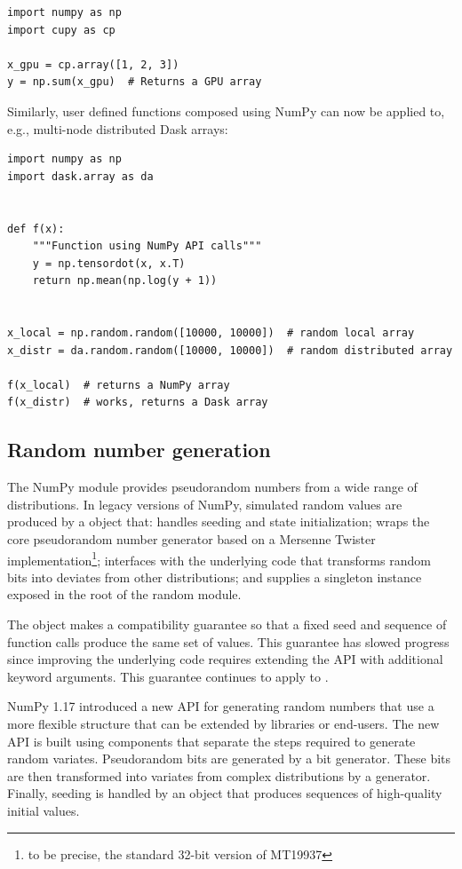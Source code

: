 \begin{lstlisting}
import numpy as np
import cupy as cp

x_gpu = cp.array([1, 2, 3])
y = np.sum(x_gpu)  # Returns a GPU array
\end{lstlisting}

Similarly, user defined functions composed using NumPy can now be
applied to, e.g., multi-node distributed Dask arrays:

\begin{lstlisting}
import numpy as np
import dask.array as da


def f(x):
    """Function using NumPy API calls"""
    y = np.tensordot(x, x.T)
    return np.mean(np.log(y + 1))


x_local = np.random.random([10000, 10000])  # random local array
x_distr = da.random.random([10000, 10000])  # random distributed array

f(x_local)  # returns a NumPy array
f(x_distr)  # works, returns a Dask array
\end{lstlisting}

\subsection*{Random number generation}

The NumPy  module provides pseudorandom numbers from a wide range of
distributions. In legacy versions of NumPy, simulated random values are produced
by a  object that: handles seeding and state initialization;
wraps the core pseudorandom number generator based on a Mersenne Twister
implementation\footnote{to be precise, the standard 32-bit version of MT19937};
interfaces with the underlying code that transforms random bits into
deviates from other distributions; and supplies a singleton instance exposed in
the root of the random module.

The  object makes a compatibility guarantee so that a fixed
seed and sequence of function calls produce the same set of values. This
guarantee has slowed progress since improving the underlying code requires
extending the API with additional keyword arguments. This guarantee continues to
apply to .

NumPy 1.17 introduced a new API for generating random numbers that use a more
flexible structure that can be extended by libraries or end-users. The new API
is built using components that separate the steps required to generate random
variates. Pseudorandom bits are generated by a bit generator. These bits are
then transformed into variates from complex distributions by a generator.
Finally, seeding is handled by an object that produces sequences of high-quality
initial values.

